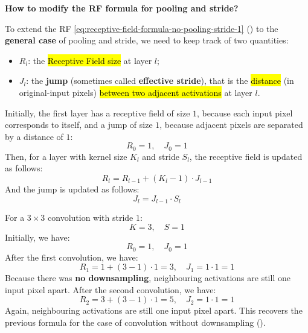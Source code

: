 \highspace
\begin{flushleft}
    \textcolor{Green3}{ \textbf{How to modify the RF formula for pooling and stride?}}
\end{flushleft}
To extend the RF \autoref{eq:receptive-field-formula-no-pooling-stride-1} () to the \textbf{general case} of pooling and stride, we need to keep track of two quantities:
\begin{itemize}
    \item $R_{l}$: the \hl{Receptive Field size} at layer $l$;
    \item $J_{l}$: the \textbf{jump} (sometimes called \textbf{effective stride}), that is the \hl{distance} (in original-input pixels) \hl{between two adjacent activations} at layer $l$.
\end{itemize}
Initially, the first layer has a receptive field of size $1$, because each input pixel corresponds to itself, and a jump of size $1$, because adjacent pixels are separated by a distance of $1$:
\begin{equation*}
    R_0 = 1, \quad J_0 = 1
\end{equation*}
Then, for a layer with kernel size $K_l$ and stride $S_l$, the receptive field is updated as follows:
\begin{equation}\label{eq:receptive-field-formula-general}
    R_{l} = R_{l-1} + \left(K_{l} - 1\right) \cdot J_{l-1}
\end{equation}
And the jump is updated as follows:
\begin{equation}\label{eq:jump-formula-general}
    J_{l} = J_{l-1} \cdot S_{l}
\end{equation}

\highspace
\begin{examplebox}[: Convolution without downsampling ($\text{stride } = 1$)]
    For a $3 \times 3$ convolution with stride $1$:
    \begin{equation*}
        K = 3, \quad S = 1
    \end{equation*}
    Initially, we have:
    \begin{equation*}
        R_0 = 1, \quad J_0 = 1
    \end{equation*}
    After the first convolution, we have:
    \begin{equation*}
        R_1 = 1 + (3 - 1) \cdot 1 = 3, \quad J_1 = 1 \cdot 1 = 1
    \end{equation*}
    Because there was \textbf{no downsampling}, neighbouring activations are still one input pixel apart. After the second convolution, we have:
    \begin{equation*}
        R_2 = 3 + (3 - 1) \cdot 1 = 5, \quad J_2 = 1 \cdot 1 = 1
    \end{equation*}
    Again, neighbouring activations are still one input pixel apart. This recovers the previous formula for the case of convolution without downsampling ().
\end{examplebox}

